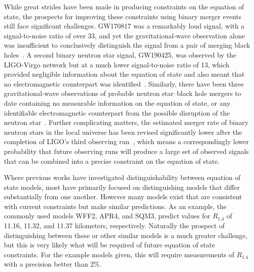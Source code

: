 While great strides have been made in producing constraints on the equation of state, the prospects for improving these constraints using binary merger events still face significant challenges. GW170817 was a remarkably loud signal, with a signal-to-noise ratio of over 33, and yet the gravitational-wave observation alone was insufficient to conclusively distinguish the signal from a pair of merging black holes~\cite{LIGOScientific:2017vwq}. A second binary neutron star signal, GW190425, was observed by the LIGO-Virgo network but at a much lower signal-to-noise ratio of 13, which provided negligible information about the equation of state and also meant that no electromagnetic counterpart was identified~\cite{LIGOScientific:2020aai}. Similarly, there have been three gravitational-wave observations of probable neutron star--black hole mergers to date containing no measurable information on the equation of state, or any identifiable electromagnetic counterpart from the possible disruption of the neutron star~\cite{LIGOScientific:2020zkf,LIGOScientific:2021qlt}. Further complicating matters, the estimated merger rate of binary neutron stars in the local universe has been revised significantly lower after the completion of LIGO's third observing run~\cite{Abbott:2020gyp}, which means a correspondingly lower probability that future observing runs will produce a large set of observed signals that can be combined into a precise constraint on the equation of state.

Where previous works have investigated distinguishability between equation of state models, most have primarily focused on distinguishing models that differ substantially from one another. However many models exist that are consistent with current constraints but make similar predictions. As an example, the commonly used models WFF2, APR4, and SQM3, predict values for $R_{1.4}$ of 11.16, 11.32, and 11.37 kilometers, respectively. Naturally the prospect of distinguishing between these or other similar models is a much greater challenge, but this is very likely what will be required of future equation of state constraints. For the example models given, this will require measurements of $R_{1.4}$ with a precision better than 2\%.

